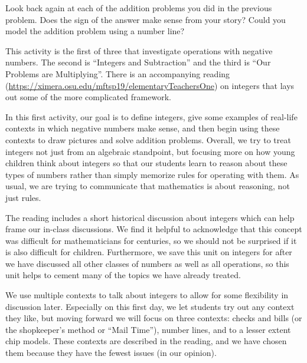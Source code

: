 \documentclass{ximera}
\begin{document}
\begin{problem}
Look back again at each of the addition problems you did in the previous problem.  Does the sign of the answer make sense from your story?  Could you model the addition problem using a number line?

\end{problem}


\newpage
\begin{instructorNotes}
This activity is the first of three that investigate operations with negative numbers.  The second is ``Integers and Subtraction'' and the third is ``Our Problems are Multiplying''.  There is an accompanying reading (\url{https://ximera.osu.edu/mftsp19/elementaryTeachersOne}) on integers that lays out some of the more complicated framework.

In this first activity, our goal is to define integers, give some examples of real-life contexts in which negative numbers make sense, and then begin using these contexts to draw pictures and solve addition problems.  Overall, we try to treat integers not just from an algebraic standpoint, but focusing more on how young children think about integers so that our students learn to reason about these types of numbers rather than simply memorize rules for operating with them.  As usual, we are trying to communicate that mathematics is about reasoning, not just rules.

The reading includes a short historical discussion about integers which can help frame our in-class discussions.  We find it helpful to acknowledge that this concept was difficult for mathematicians for centuries, so we should not be surprised if it is also difficult for children.  Furthermore, we save this unit on integers for after we have discussed all other classes of numbers as well as all operations, so this unit helps to cement many of the topics we have already treated.

We use multiple contexts to talk about integers to allow for some flexibility in discussion later.  Especially on this first day, we let students try out any context they like, but moving forward we will focus on three contexts: checks and bills (or the shopkeeper's method or ``Mail Time''), number lines, and to a lesser extent chip models.  These contexts are described in the reading, and we have chosen them because they have the fewest issues (in our opinion).


\end{instructorNotes}
\end{document}

